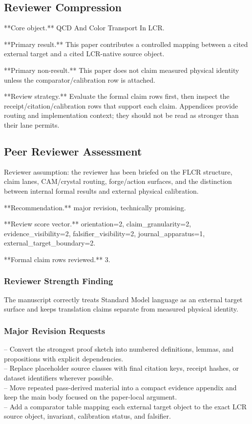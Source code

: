 \documentclass[11pt]{article}
\begin{document}
\subsection*{Reviewer Compression}

**Core object.** QCD And Color Transport In LCR.

**Primary result.** This paper contributes a controlled mapping between a cited external target and a cited LCR-native source object.

**Primary non-result.** This paper does not claim measured physical identity unless the comparator/calibration row is attached.

**Review strategy.** Evaluate the formal claim rows first, then inspect the receipt/citation/calibration rows that support each claim. Appendices provide routing and implementation context; they should not be read as stronger than their lane permits.

\subsection*{Peer Reviewer Assessment}

Reviewer assumption: the reviewer has been briefed on the FLCR structure, claim lanes, CAM/crystal routing, forge/action surfaces, and the distinction between internal formal results and external physical calibration.

**Recommendation.** major revision, technically promising.

**Review score vector.** orientation=2, claim\_granularity=2, evidence\_visibility=2, falsifier\_visibility=2, journal\_apparatus=1, external\_target\_boundary=2.

**Formal claim rows reviewed.** 3.

\subsubsection*{Reviewer Strength Finding}

The manuscript correctly treats Standard Model language as an external target surface and keeps translation claims separate from measured physical identity.

\subsubsection*{Major Revision Requests}

\noindent{}-- Convert the strongest proof sketch into numbered definitions, lemmas, and propositions with explicit dependencies.\\
\noindent{}-- Replace placeholder source classes with final citation keys, receipt hashes, or dataset identifiers wherever possible.\\
\noindent{}-- Move repeated pass-derived material into a compact evidence appendix and keep the main body focused on the paper-local argument.\\
\noindent{}-- Add a comparator table mapping each external target object to the exact LCR source object, invariant, calibration status, and falsifier.\\
\end{document}
